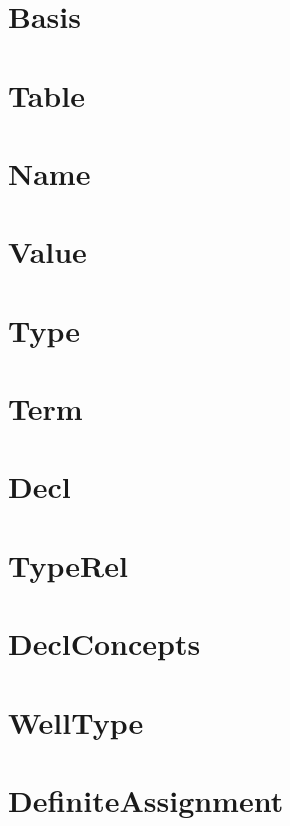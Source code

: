 \documentclass[11pt,a4paper]{book}
\begin{document}
\chapter{Basis}


\chapter{Table}
    

\chapter{Name}


\chapter{Value}     


\chapter{Type}
      

\chapter{Term}
     

\chapter{Decl}
          

\chapter{TypeRel}
   

\chapter{DeclConcepts}
  

\chapter{WellType}


\chapter{DefiniteAssignment}

\end{document}
